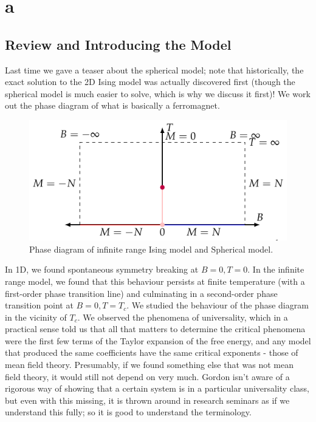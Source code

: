 \section{a}

\subsection{Review and Introducing the Model}
Last time we gave a teaser about the spherical model; note that historically, the exact solution to the 2D Ising model was actually discovered first (though the spherical model is much easier to solve, which is why we discuss it first)! We work out the phase diagram of what is basically a ferromagnet.

\begin{figure}[htbp]
    \centering
    \includegraphics{Images/fig-IsingphasediagramB0.pdf}
    \caption{Phase diagram of infinite range Ising model and Spherical model.}
    \label{fig-sphericalmodelphasediagram}
\end{figure}

In 1D, we found spontaneous symmetry breaking at $B = 0, T = 0$. In the infinite range model, we found that this behaviour persists at finite temperature (with a first-order phase transition line) and culminating in a second-order phase transition point at $B = 0, T = T_c$. We studied the behaviour of the phase diagram in the vicinity of $T_c$. We observed the phenomena of universality, which in a practical sense told us that all that matters to determine the critical phenomena were the first few terms of the Taylor expansion of the free energy, and any model that produced the same coefficients have the same critical exponents - those of mean field theory. Presumably, if we found something else that was not mean field theory, it would still not depend on very much. Gordon isn't aware of a rigorous way of showing that a certain system is in a particular universality class, but even with this missing, it is thrown around in research seminars as if we understand this fully; so it is good to understand the terminology.

